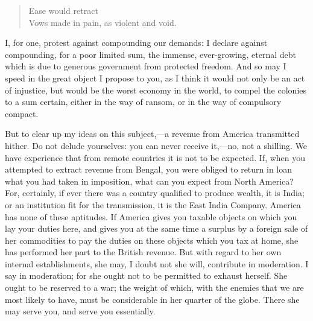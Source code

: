 \begin{verse}
Ease would retract \\
Vows made in pain, as violent and void.
\end{verse}

I, for one, protest against compounding our demands: I declare against compounding, for a poor limited sum, the immense, ever-growing, eternal debt which is due to generous government from protected freedom. And so may I speed in the great object I propose to you, as I think it would not only be an act of injustice, but would be the worst economy in the world, to compel the colonies to a sum certain, either in the way of ransom, or in the way of compulsory compact.

But to clear up my ideas on this subject,—a revenue from America transmitted hither. Do not delude yourselves: you can never receive it,—no, not a shilling. We have experience that from remote countries it is not to be expected. If, when you attempted to extract revenue from Bengal, you were obliged to return in loan what you had taken in imposition, what can you expect from North America? For, certainly, if ever there was a country qualified to produce wealth, it is India; or an institution fit for the transmission, it is the East India Company. America has none of these aptitudes. If America gives you taxable objects on which you lay your duties here, and gives you at the same time a surplus by a foreign sale of her commodities to pay the duties on these objects which you tax at home, she has performed her part to the British revenue. But with regard to her own internal establishments, she may, I doubt not she will, contribute in moderation. I say in moderation; for she ought not to be permitted to exhaust herself. She ought to be reserved to a war; the weight of which, with the enemies that we are most likely to have, must be considerable in her quarter of the globe. There she may serve you, and serve you essentially.

